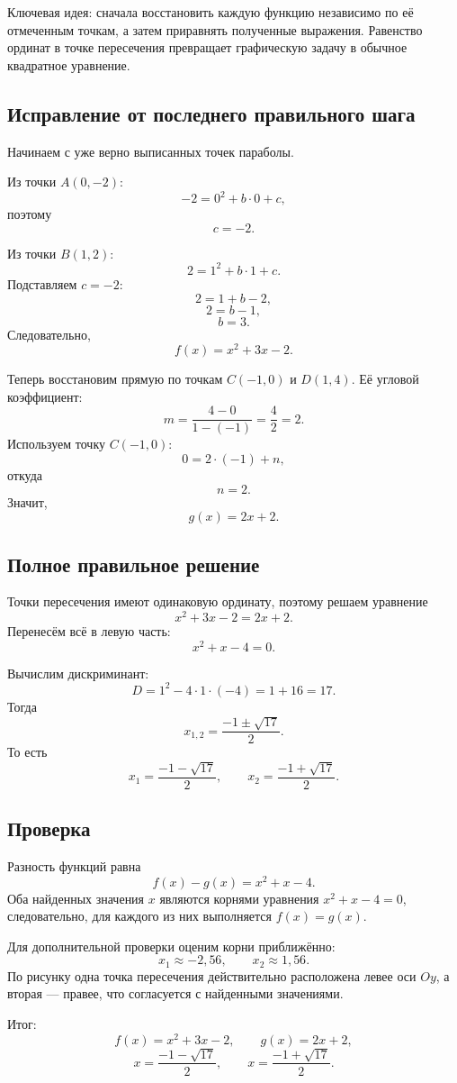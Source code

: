 \documentclass[12pt,a4paper]{article}
\begin{document}
\textcolor{blue!60!black}{Ключевая идея:} сначала восстановить каждую функцию независимо по её отмеченным точкам, а затем приравнять полученные выражения. Равенство ординат в точке пересечения превращает графическую задачу в обычное квадратное уравнение.

\subsection*{Исправление от последнего правильного шага}
Начинаем с уже верно выписанных точек параболы.

Из точки \(A(0,-2)\):
\[
  -2=0^2+b\cdot0+c,
\]
поэтому
\[
  c=-2.
\]

Из точки \(B(1,2)\):
\[
  2=1^2+b\cdot1+c.
\]
Подставляем \(c=-2\):
\[
  2=1+b-2,
\]
\[
  2=b-1,
\]
\[
  b=3.
\]
Следовательно,
\[
  f(x)=x^2+3x-2.
\]

Теперь восстановим прямую по точкам \(C(-1,0)\) и \(D(1,4)\). Её угловой коэффициент:
\[
  m=\frac{4-0}{1-(-1)}=\frac{4}{2}=2.
\]
Используем точку \(C(-1,0)\):
\[
  0=2\cdot(-1)+n,
\]
откуда
\[
  n=2.
\]
Значит,
\[
  g(x)=2x+2.
\]

\subsection*{Полное правильное решение}
Точки пересечения имеют одинаковую ординату, поэтому решаем уравнение
\[
  x^2+3x-2=2x+2.
\]
Перенесём всё в левую часть:
\[
  x^2+x-4=0.
\]

Вычислим дискриминант:
\[
  D=1^2-4\cdot1\cdot(-4)=1+16=17.
\]
Тогда
\[
  x_{1,2}=\frac{-1\pm\sqrt{17}}{2}.
\]
То есть
\[
  x_1=\frac{-1-\sqrt{17}}{2},
  \qquad
  x_2=\frac{-1+\sqrt{17}}{2}.
\]

\subsection*{Проверка}
Разность функций равна
\[
  f(x)-g(x)=x^2+x-4.
\]
Оба найденных значения \(x\) являются корнями уравнения \(x^2+x-4=0\), следовательно, для каждого из них выполняется \(f(x)=g(x)\).

Для дополнительной проверки оценим корни приближённо:
\[
  x_1\approx -2{,}56, \qquad x_2\approx 1{,}56.
\]
По рисунку одна точка пересечения действительно расположена левее оси \(Oy\), а вторая --- правее, что согласуется с найденными значениями.

\textcolor{teal!60!black}{Итог:}
\[
  \boxed{f(x)=x^2+3x-2}, \qquad
  \boxed{g(x)=2x+2},
\]
\[
  \boxed{x=\frac{-1-\sqrt{17}}{2}}, \qquad
  \boxed{x=\frac{-1+\sqrt{17}}{2}}.
\]
\end{document}

